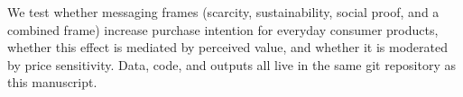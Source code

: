 We test whether messaging frames (scarcity, sustainability, social proof, and a
combined frame) increase purchase intention for everyday consumer products,
whether this effect is mediated by perceived value, and whether it is moderated
by price sensitivity. Data, code, and outputs all live in the same git
repository as this manuscript.
